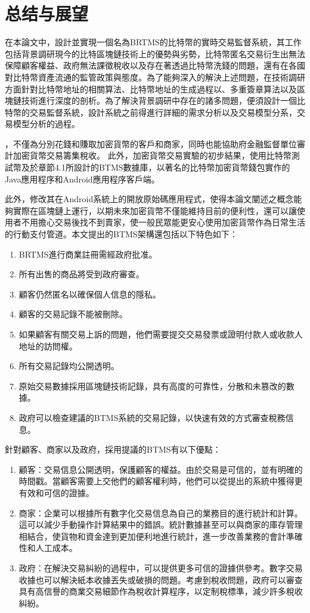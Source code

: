  
\chapter{总结与展望}
在本論文中，設計並實現一個名為BRTMS的比特幣的實時交易監督系統，其工作包括背景調研現今的比特區塊鏈技術上的優勢與劣勢，比特幣匿名交易衍生出無法保障顧客權益、政府無法課徵稅收以及存在著透過比特幣洗錢的問題，還有在各國對比特幣資產流通的監管政策與態度。為了能夠深入的解決上述問題，在技術調研方面針對比特幣地址的相關算法、比特幣地址的生成過程以、多重簽章算法以及區塊鏈技術進行深度的剖析。為了解決背景調研中存在的諸多問題，便須設計一個比特幣的交易監督系統，設計系統之前得進行詳細的需求分析以及交易模型分系，交易模型分析的過程。

，不僅為分別花錢和賺取加密貨幣的客戶和商家，同時也能協助府金融監督單位審計加密貨幣交易籌集稅收。 此外，加密貨幣交易實驗的初步結果，使用比特幣測試幣及於章節4.1所設計的BTMS數據庫，以著名的比特幣加密貨幣錢包實作的Java應用程序和Android應用程序客戶端。
	
此外，修改其在Android系統上的開放原始碼應用程式，使得本論文闡述之概念能夠實際在區塊鏈上運行，以期未來加密貨幣不僅能維持目前的便利性，還可以讓使用者不用擔心交易後找不到賣家，使一般民眾能更安心使用加密貨幣作為日常生活的行動支付管道。本文提出的BTMS架構還包括以下特色如下：

		\begin{enumerate}
			\item BRTMS進行商業註冊需經政府批准。
			\item 所有出售的商品將受到政府審查。
			\item 顧客仍然匿名以確保個人信息的隱私。
			\item 顧客的交易記錄不能被刪除。
			\item 如果顧客有關交易上訴的問題，他們需要提交交易發票或證明付款人或收款人地址的訪問權。
			\item 所有交易記錄均公開透明。
			\item 原始交易數據採用區塊鏈技術記錄，具有高度的可靠性，分散和未篡改的數據。
			\item 政府可以檢查建議的BTMS系統的交易記錄，以快速有效的方式審查稅務信息。
		\end{enumerate}

針對顧客、商家以及政府，採用提議的BTMS有以下優點：

	\begin{enumerate}
		\item 顧客：交易信息公開透明，保護顧客的權益。由於交易是可信的，並有明確的時間戳。當顧客需要上交他們的顧客權利時，他們可以從提出的系統中獲得更有效和可信的證據。
		\item 商家：企業可以根據所有數字化交易信息為自己的業務目的進行統計和計算。這可以減少手動操作計算結果中的錯誤。統計數據甚至可以與商家的庫存管理相結合，使貨物和資金達到更加便利地進行統計，進一步改善業務的會計準確性和人工成本。
		\item 政府：在解決交易糾紛的過程中，可以提供更多可信的證據供參考。數字交易收據也可以解決紙本收據丟失或破損的問題。考慮到稅收問題，政府可以審查具有高信譽的商業交易細節作為稅收計算程序，以定制稅標準，減少許多稅收糾紛。
	\end{enumerate}
	